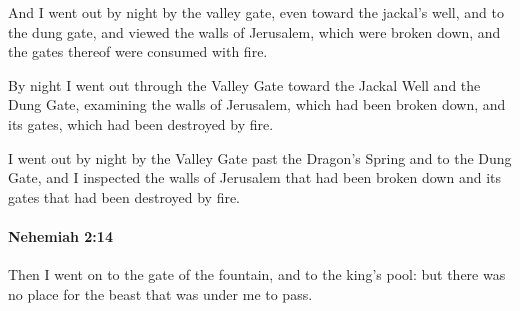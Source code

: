 			\begin{versebox}
					\item[BHS] 
					\item[LXX] 
					\item[ASV] And I went out by night by the valley gate, even toward the jackal's well, and to the dung gate, and viewed the walls of Jerusalem, which were broken down, and the gates thereof were consumed with fire.
					\item[NIV] By night I went out through the Valley Gate toward the Jackal Well and the Dung Gate, examining the walls of Jerusalem, which had been broken down, and its gates, which had been destroyed by fire.
					\item[NRSV] I went out by night by the Valley Gate past the Dragon’s Spring and to the Dung Gate, and I inspected the walls of Jerusalem that had been broken down and its gates that had been destroyed by fire.
			\end{versebox}

		\paragraph{Nehemiah 2:14} %
			\label{NEHEMIAH-2-14}

			Then I went on to the gate of the fountain, and to the king’s pool: but there was no place for the beast that was under me to pass.

